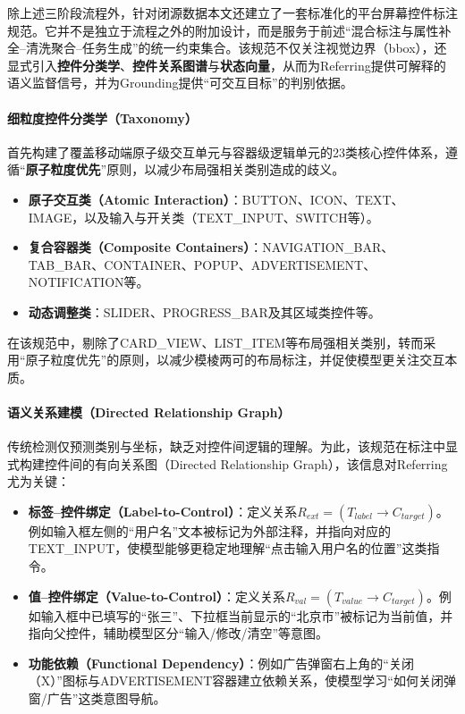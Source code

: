 除上述三阶段流程外，针对闭源数据本文还建立了一套标准化的平台屏幕控件标注规范。它并不是独立于流程之外的附加设计，而是服务于前述“混合标注与属性补全--清洗聚合--任务生成”的统一约束集合。该规范不仅关注视觉边界（bbox），还显式引入\textbf{控件分类学}、\textbf{控件关系图谱}与\textbf{状态向量}，从而为Referring提供可解释的语义监督信号，并为Grounding提供“可交互目标”的判别依据。

\paragraph{细粒度控件分类学（Taxonomy）}
首先构建了覆盖移动端原子级交互单元与容器级逻辑单元的23类核心控件体系，遵循“\textbf{原子粒度优先}”原则，以减少布局强相关类别造成的歧义。
\begin{itemize}
  \item \textbf{原子交互类（Atomic Interaction）}：BUTTON、ICON、TEXT、IMAGE，以及输入与开关类（TEXT\_INPUT、SWITCH等）。
  \item \textbf{复合容器类（Composite Containers）}：NAVIGATION\_BAR、TAB\_BAR、CONTAINER、POPUP、ADVERTISEMENT、NOTIFICATION等。
  \item \textbf{动态调整类}：SLIDER、PROGRESS\_BAR及其区域类控件等。
\end{itemize}
在该规范中，剔除了CARD\_VIEW、LIST\_ITEM等布局强相关类别，转而采用“原子粒度优先”的原则，以减少模棱两可的布局标注，并促使模型更关注交互本质。

\paragraph{语义关系建模（Directed Relationship Graph）}
传统检测仅预测类别与坐标，缺乏对控件间逻辑的理解。为此，该规范在标注中显式构建控件间的有向关系图（Directed Relationship Graph），该信息对Referring尤为关键：
\begin{itemize}
  \item \textbf{标签--控件绑定（Label-to-Control）}：定义关系$R_{ext}=(T_{label}\rightarrow C_{target})$。例如输入框左侧的“用户名”文本被标记为外部注释，并指向对应的TEXT\_INPUT，使模型能够更稳定地理解“点击输入用户名的位置”这类指令。
  \item \textbf{值--控件绑定（Value-to-Control）}：定义关系$R_{val}=(T_{value}\rightarrow C_{target})$。例如输入框中已填写的“张三”、下拉框当前显示的“北京市”被标记为当前值，并指向父控件，辅助模型区分“输入/修改/清空”等意图。
  \item \textbf{功能依赖（Functional Dependency）}：例如广告弹窗右上角的“关闭（X）”图标与ADVERTISEMENT容器建立依赖关系，使模型学习“如何关闭弹窗/广告”这类意图导航。
\end{itemize}


